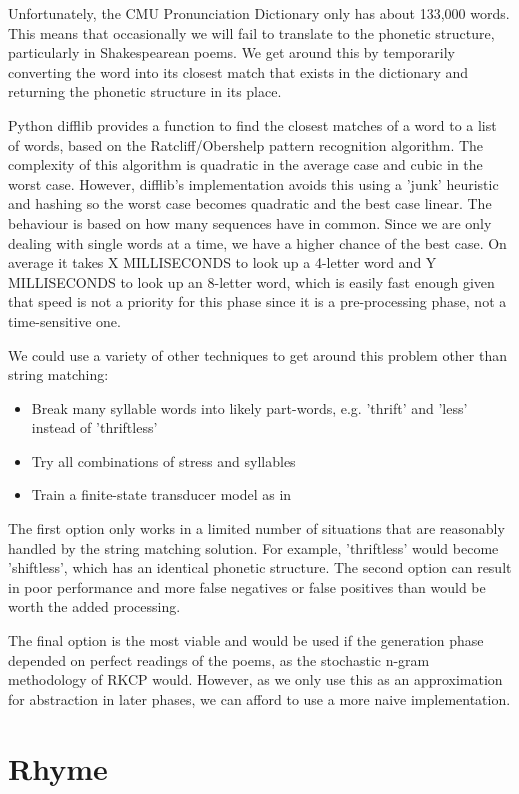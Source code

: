 Unfortunately, the CMU Pronunciation Dictionary only has about 133,000 words. This means that occasionally we will fail to translate to the phonetic structure, particularly in Shakespearean poems. We get around this by temporarily converting the word into its closest match that exists in the dictionary and returning the phonetic structure in its place.

Python difflib provides a function to find the closest matches of a word to a list of words, based on the Ratcliff/Obershelp pattern recognition algorithm. The complexity of this algorithm is quadratic in the average case and cubic in the worst case. However, difflib's implementation avoids this using a 'junk' heuristic and hashing so the worst case becomes quadratic and the best case linear. The behaviour is based on  how many sequences have in common. Since we are only dealing with single words at a time, we have a higher chance of the best case. On average it takes X MILLISECONDS to look up a 4-letter word and Y MILLISECONDS to look up an 8-letter word, which is easily fast enough given that speed is not a priority for this phase since it is a pre-processing phase, not a time-sensitive one.

We could use a variety of other techniques to get around this problem other than string matching:
\begin{itemize}
\item{Break many syllable words into likely part-words, e.g. 'thrift' and 'less' instead of 'thriftless'}
\item{Try all combinations of stress and syllables}
\item{Train a finite-state transducer model as in \cite{dobrivsek2010towards}}
\end{itemize}

The first option only works in a limited number of situations that are reasonably handled by the string matching solution. For example, 'thriftless' would become 'shiftless', which has an identical phonetic structure. The second option can result in poor performance and more false negatives or false positives than would be worth the added processing.

The final option is the most viable and would be used if the generation phase depended on perfect readings of the poems, as the stochastic n-gram methodology of RKCP would. However, as we only use this as an approximation for abstraction in later phases, we can afford to use a more naive implementation.


\section{Rhyme}



